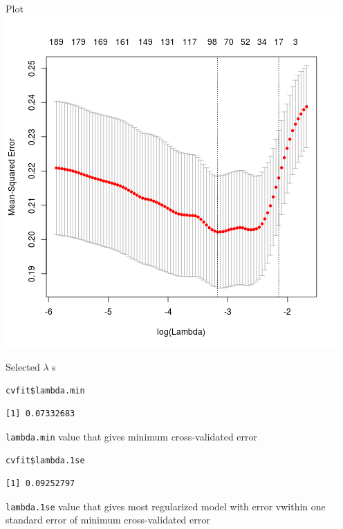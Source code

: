 \documentclass[bigger]{beamer}
\begin{document}
\begin{frame}[label=sec-1-2-2]{Plot}
\includegraphics[width=.9\linewidth]{cvplot.png}
\end{frame}

\begin{frame}[fragile,label=sec-1-2-3]{Selected $\lambda$ s}
 \begin{verbatim}
cvfit$lambda.min
\end{verbatim}

\begin{verbatim}
[1] 0.07332683
\end{verbatim}

\begin{block}{\verb~lambda.min~ value that gives minimum cross-validated error}
\begin{verbatim}
cvfit$lambda.1se
\end{verbatim}

\begin{verbatim}
[1] 0.09252797
\end{verbatim}
\end{block}

\begin{block}{\verb~lambda.1se~ value that gives most regularized model with error vwithin one standard error of minimum cross-validated error}
\end{block}
\end{frame}
\end{document}
